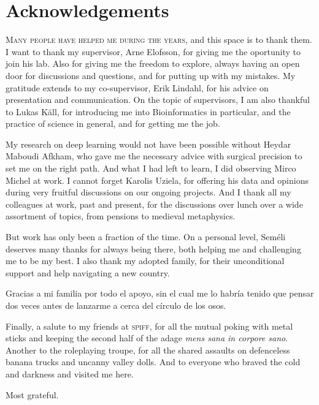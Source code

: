 \chapter*{Acknowledgements}

\lettrine[lines=3, lhang=0.1, nindent=0em]{\color{Maroon}M}{any people have helped me during the years,}
and this space is to thank them.
I want to thank my supervisor, Arne Elofsson, for giving me the oportunity to join his lab.
Also for giving me the freedom to explore, always having an open door for discussions and questions, and for putting up with my mistakes.
My gratitude extends to my co-supervisor, Erik Lindahl, for his advice on presentation and communication.
On the topic of supervisors, I am also thankful to Lukas Käll, for introducing me into Bioinformatics in particular, and the practice of science in general, and for getting me the job.

\begin{center}
    {\color{Maroon}\adfleafleft}
\end{center}

My research on deep learning would not have been possible without Heydar Maboudi Afkham, who gave me the necessary advice with surgical precision to set me on the right path.
And what I had left to learn, I did observing Mirco Michel at work.
I cannot forget Karolis Uziela, for offering his data and opinions during very fruitful discussions on our ongoing projects.
And I thank all my colleagues at work, past and present, for the discussions over lunch over a wide assortment of topics, from pensions to medieval metaphysics. 

\begin{center}
    {\color{Maroon}\adfflowerleft}
\end{center}

But work has only been a fraction of the time.
On a personal level, Seméli deserves many thanks for always being there, both helping me and challenging me to be my best.
I also thank my adopted family, for their unconditional support and help navigating a new country.

\smallskip
\begin{otherlanguage}{spanish}
	Gracias a mi familia por todo el apoyo, sin el cual me lo habría tenido que pensar dos veces antes de lanzarme a cerca del círculo de los osos.
\end{otherlanguage}

\begin{center}
    \medskip
    {\color{Maroon}\adfdownleafright}
    \medskip
\end{center}

Finally, a salute to my friends at \textsc{spiff}, for all the mutual poking with metal sticks and keeping the second half of the adage \emph{mens sana in corpore sano}.
Another to the roleplaying troupe, for all the shared assaults on defenceless banana trucks and uncanny valley dolls.
And to everyone who braved the cold and darkness and visited me here.

\bigskip
\hfil
\raggedleft
Most grateful.



